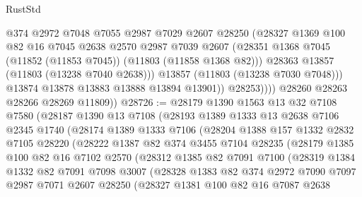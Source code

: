 \begin{lexlean}{RustStd}
\begin{coremodule}
                      @374
                      @2972
                      @7048
                      @7055
                      @2987
                      @7029
                      @2607
                      @28250
                      (@28327
                        @1369
                        @100
                        @82
                        @16
                        @7045
                        @2638
                        @2570
                        @2987
                        @7039
                        @2607
                        (@28351 @1368 @7045 (@11852 (@11853 @7045)) (@11803 (@11858 @1368 @82)))
                        @28363
                        @13857
                        (@11803 (@13238 @7040 @2638)))
                      @13857
                      (@11803 (@13238 @7030 @7048)))
                    @13874
                    @13878
                    @13883
                    @13888
                    @13894
                    @13901))
                @28253))))
        @28260
        @28263
        @28266
        @28269
        @11809))
@28726 := @28179
    @1390
    @1563
    @13
    @32
    @7108
    @7580
    (@28187
      @1390
      @13
      @7108
      (@28193
        @1389
        @1333
        @13
        @2638
        @7106
        @2345
        @1740
        (@28174
          @1389
          @1333
          @7106
          (@28204
            @1388
            @157
            @1332
            @2832
            @7105
            @28220
            (@28222
              @1387
              @82
              @374
              @3455
              @7104
              @28235
              (@28179
                @1385
                @100
                @82
                @16
                @7102
                @2570
                (@28312
                  @1385
                  @82
                  @7091
                  @7100
                  (@28319
                    @1384
                    @1332
                    @82
                    @7091
                    @7098
                    @3007
                    (@28328
                      @1383
                      @82
                      @374
                      @2972
                      @7090
                      @7097
                      @2987
                      @7071
                      @2607
                      @28250
                      (@28327
                        @1381
                        @100
                        @82
                        @16
                        @7087
                        @2638

\end{coremodule}
\end{lexlean}
